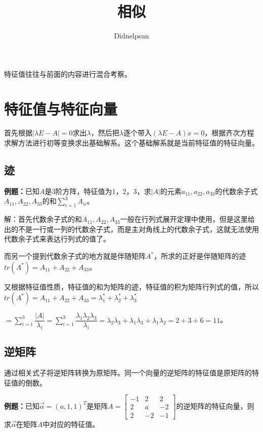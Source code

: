 \documentclass[UTF8, 12pt]{ctexart}
\author{Didnelpsun}
\title{相似}
\date{}
\begin{document}
\maketitle
\pagestyle{empty}
\thispagestyle{empty}
\tableofcontents
\thispagestyle{empty}
\newpage
\pagestyle{plain}
\setcounter{page}{1}

特征值往往与前面的内容进行混合考察。

\section{特征值与特征向量}

首先根据$\vert\lambda E-A\vert=0$求出$\lambda$，然后把$\lambda$逐个带入$(\lambda E-A)x=0$，根据齐次方程求解方法进行初等变换求出基础解系。这个基础解系就是当前特征值的特征向量。

\subsection{迹}

\textbf{例题：}已知$A$是3阶方阵，特征值为1，2，3，求$\vert A\vert$的元素$a_{11},a_{22},a_{33}$的代数余子式$A_{11},A_{22},A_{33}$的和$\sum\limits_{i=1}^3A_{ii}$。

解：首先代数余子式的和$A_{11},A_{22},A_{33}$一般在行列式展开定理中使用，但是这里给出的不是一行或一列的代数余子式，而是主对角线上的代数余子式，这就无法使用代数余子式来表达行列式的值了。

而另一个提到代数余子式的地方就是伴随矩阵$A^*$，所求的正好是伴随矩阵的迹$tr(A^*)=A_{11}+A_{22}+A_{33}$。

又根据特征值性质，特征值的和为矩阵的迹，特征值的积为矩阵行列式的值，所以$tr(A^*)=A_{11}+A_{22}+A_{33}=\lambda_1^*+\lambda_2^*+\lambda_3^*$

$=\sum\limits_{i=1}^3\dfrac{\vert A\vert}{\lambda_i}=\sum\limits_{i=1}^3\dfrac{\lambda_1\lambda_2\lambda_3}{\lambda_i}=\lambda_2\lambda_3+\lambda_1\lambda_3+\lambda_1\lambda_2=2+3+6=11$。

\subsection{逆矩阵}

通过相关式子将逆矩阵转换为原矩阵。同一个向量的逆矩阵的特征值是原矩阵的特征值的倒数。

\textbf{例题：}已知$\overrightarrow{\alpha}=(a,1,1)^T$是矩阵$A=\left[\begin{array}{ccc}
    -1 & 2 & 2 \\
    2 & a & -2 \\
    2 & -2 & -1
\end{array}\right]$的逆矩阵的特征向量，则求$\overrightarrow{\alpha}$在矩阵$A$中对应的特征值。
\end{document}
